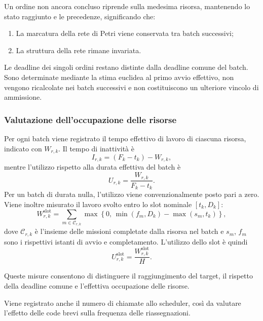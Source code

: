 \noindent Un ordine non ancora concluso
riprende sulla medesima risorsa, mantenendo
lo stato raggiunto e le precedenze, significando che:
\begin{enumerate}
	\item La marcatura della rete di Petri viene conservata
	tra batch successivi;
	\item La struttura della rete rimane invariata.
\end{enumerate}

\noindent Le deadline dei singoli ordini restano distinte
dalla deadline comune del batch. Sono determinate
mediante la stima euclidea al primo avvio effettivo,
non vengono ricalcolate nei batch successivi
e non costituiscono un ulteriore vincolo
di ammissione.

\subsubsection{Valutazione dell'occupazione delle risorse}

Per ogni batch viene registrato il tempo effettivo
di lavoro di ciascuna risorsa, indicato con $W_{r,k}$.
Il tempo di inattività è
\begin{equation}
	I_{r,k}=(F_k-t_k)-W_{r,k},
\end{equation}
mentre l'utilizzo rispetto alla durata effettiva
del batch è
\begin{equation}
	U_{r,k}
	=
	\frac{W_{r,k}}{F_k-t_k}.
\end{equation}
Per un batch di durata nulla, l'utilizzo viene
convenzionalmente posto pari a zero. Viene inoltre misurato il lavoro svolto entro
lo slot nominale $[t_k,D_k]$:
\begin{equation}
	W_{r,k}^{\mathrm{slot}}
	=
	\sum_{m\in\mathcal{C}_{r,k}}
	\max\left\{
	0,\,
	\min(f_m,D_k)-\max(s_m,t_k)
	\right\},
\end{equation}
\noindent dove $\mathcal{C}_{r,k}$ è l'insieme delle missioni
completate dalla risorsa nel batch e $s_m$, $f_m$
sono i rispettivi istanti di avvio e completamento.
L'utilizzo dello slot è quindi
\begin{equation}
	U_{r,k}^{\mathrm{slot}}
	=
	\frac{W_{r,k}^{\mathrm{slot}}}{H}.
\end{equation}

\noindent Queste misure consentono di distinguere il raggiungimento
del target, il rispetto della deadline comune
e l'effettiva occupazione delle risorse.
\begin{nota}
	Viene registrato anche il numero di chiamate
	allo scheduler, così da valutare l'effetto delle
	code brevi sulla frequenza delle riassegnazioni.
\end{nota}


